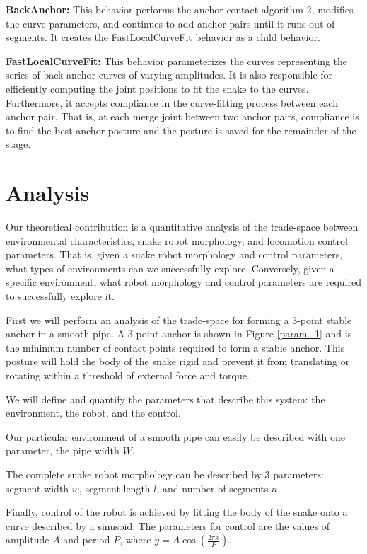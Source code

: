 \textbf{BackAnchor:} 
This behavior performs the anchor contact algorithm 2, modifies the curve parameters, and continues to add anchor pairs until it runs out of segments.  It creates the FastLocalCurveFit behavior as a child behavior.

\textbf{FastLocalCurveFit:} 
This behavior parameterizes the curves representing the series of back anchor curves of varying amplitudes.  It is also responsible for efficiently computing the joint positions to fit the snake to the curves.  Furthermore, it accepts compliance in the curve-fitting process between each anchor pair.  That is, at each merge joint between two anchor pairs, compliance is to find the best anchor posture and the posture is saved for the remainder of the stage.


\section{Analysis}


Our theoretical contribution is a quantitative analysis of the trade-space between environmental characteristics, snake robot morphology, and locomotion control parameters.  That is, given a snake robot morphology and control parameters, what types of environments can we successfully explore.  Conversely, given a specific environment, what robot morphology and control parameters are required to successfully explore it.

First we will perform an analysis of the trade-space for forming a 3-point stable anchor in a smooth pipe.  A 3-point anchor is shown in Figure \ref{param_1} and is the minimum number of contact points required to form a stable anchor.  This posture will hold the body of the snake rigid and prevent it from translating or rotating within a threshold of external force and torque.

We will define and quantify the parameters that describe this system: the environment, the robot, and the control.

Our particular environment of a smooth pipe can easily be described with one parameter, the pipe width $W$.

The complete snake robot morphology can be described by 3 parameters: segment width $w$, segment length $l$, and number of segments $n$.

Finally, control of the robot is achieved by fitting the body of the snake onto a curve described by a sinusoid.  The parameters for control are the values of amplitude $A$ and period $P$, where $y = A \cos(\frac{2 \pi x}{P})$.  

